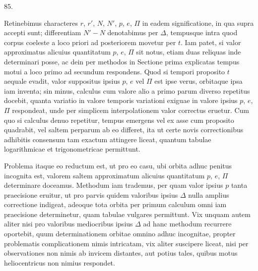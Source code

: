 \par{}\medskip
\hypertarget{native-114-article085}{}
\begin{center}85.\end{center}
Retinebimus characteres $r$, $r'$, $N$, $N'$, $p$, $e$, $\Pi$ in eadem significatione, in qua supra accepti sunt; differentiam $N'-N$ denotabimus per $\Delta$, tempusque intra quod corpus coeleste a loco priori ad posteriorem movetur per $t$. Iam patet, si valor approximatus alicuius quantitatum $p$, $e$, $\Pi$ sit notus, etiam duas reliquas inde determinari posse, ac dein per methodos in Sectione prima explicatas tempus motui a loco primo ad secundum respondens. Quod si tempori proposito $t$ aequale evadit, valor suppositus ipsius $p$, $e$ vel $\Pi$ est ipse verus, orbitaque ipsa iam inventa; sin minus, calculus cum valore alio a primo parum diverso repetitus docebit, quanta variatio in valore temporis variationi exiguae in valore ipsius $p$, $e$, $\Pi$ respondeat, unde per simplicem interpolationem valor correctus eruetur. Cum quo si calculus denuo repetitur, tempus emergens vel ex asse cum proposito quadrabit, vel saltem perparum ab eo differet, ita ut certe novis correctionibus adhibitis consensum tam exactum attingere liceat, quantum tabulae logarithmicae et trigonometricae permittunt.

Problema itaque eo reductum est, ut pro eo casu, ubi orbita adhuc penitus incognita est, valorem saltem approximatum alicuius quantitatum $p$, $e$, $\Pi$ determinare doceamus. Methodum iam trademus, per quam valor ipsius $p$ tanta praecisione eruitur, ut pro parvis quidem valoribus ipsius $\Delta$ nulla amplius correctione indigeat, adeoque tota orbita per primum calculum omni iam praecisione determinetur, quam tabulae vulgares permittunt. Vix unquam autem aliter nisi pro valoribus mediocribus ipsius $\Delta$ ad hanc methodum recurrere oportebit, quum determinationem orbitae omnino adhuc incognitae, propter problematis complicationem nimis intricatam, vix aliter suscipere liceat, nisi per observationes non nimis ab invicem distantes, aut potius tales, quibus motus heliocentricus non nimius respondet.

